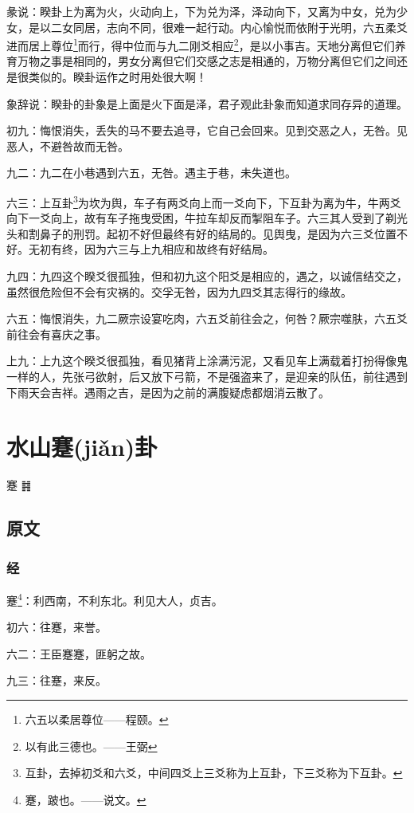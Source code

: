\documentclass[12pt,oneside]{book}
\begin{document}
彖说：睽卦上为离为火，火动向上，下为兑为泽，泽动向下，又离为中女，兑为少女，是以二女同居，志向不同，很难一起行动。内心愉悦而依附于光明，六五柔爻进而居上尊位\footnote{六五以柔居尊位——程颐。}而行，得中位而与九二刚爻相应\footnote{以有此三德也。——王弼}，是以小事吉。天地分离但它们养育万物之事是相同的，男女分离但它们交感之志是相通的，万物分离但它们之间还是很类似的。睽卦运作之时用处很大啊！

象辞说：睽卦的卦象是上面是火下面是泽，君子观此卦象而知道求同存异的道理。


初九：悔恨消失，丢失的马不要去追寻，它自己会回来。见到交恶之人，无咎。见恶人，不避咎故而无咎。

九二：九二在小巷遇到六五，无咎。遇主于巷，未失道也。

六三：上互卦\footnote{互卦，去掉初爻和六爻，中间四爻上三爻称为上互卦，下三爻称为下互卦。}为坎为舆，车子有两爻向上而一爻向下，下互卦为离为牛，牛两爻向下一爻向上，故有车子拖曳受困，牛拉车却反而掣阻车子。六三其人受到了剃光头和割鼻子的刑罚。起初不好但最终有好的结局的。见舆曳，是因为六三爻位置不好。无初有终，因为六三与上九相应和故终有好结局。

九四：九四这个睽爻很孤独，但和初九这个阳爻是相应的，遇之，以诚信结交之，虽然很危险但不会有灾祸的。交孚无咎，因为九四爻其志得行的缘故。

六五：悔恨消失，九二厥宗设宴吃肉，六五爻前往会之，何咎？厥宗噬肤，六五爻前往会有喜庆之事。

上九：上九这个睽爻很孤独，看见猪背上涂满污泥，又看见车上满载着打扮得像鬼一样的人，先张弓欲射，后又放下弓箭，不是强盗来了，是迎亲的队伍，前往遇到下雨天会吉祥。遇雨之吉，是因为之前的满腹疑虑都烟消云散了。


\chapter{水山蹇(jiǎn)卦}
蹇 {\Large ䷦}

\section{原文}

\subsection{经}
蹇\footnote{蹇，跛也。——说文。}：利西南，不利东北。利见大人，贞吉。

初六：往蹇，来誉。

六二：王臣蹇蹇，匪躬之故。

九三：往蹇，来反。
\end{document}
